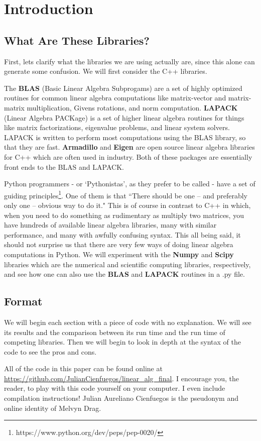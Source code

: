 \chapter{Introduction}
\section{What Are These Libraries?}
First, lets clarify what the libraries we are using actually are, since this alone can generate some confusion. We will first consider the C++ libraries.

The \textbf{BLAS} (Basic Linear Algebra Subprogams) are a set of highly optimized routines for common linear algebra computations like matrix-vector and matrix-matrix multiplication, Givens rotations, and norm computation. \textbf{LAPACK} (Linear Algebra PACKage) is a set of higher linear algebra routines for things like matrix factorizations, eigenvalue problems, and linear system solvers. LAPACK is written to perform most computations using the BLAS library, so that they are fast. \textbf{Armadillo} and \textbf{Eigen} are open source linear algebra libraries for C++ which are often used in industry. Both of these packages are essentially front ends to the BLAS and LAPACK.

Python programmers - or `Pythonistas', as they prefer to be called - have a set of guiding principles\footnote{https://www.python.org/dev/peps/pep-0020/}. One of them is that ``There should be one -- and preferably only one -- obvious way to do it." This is of course in contrast to C++ in which, when you need to do something as rudimentary as multiply two matrices, you have hundreds of available linear algebra libraries, many with similar performance, and many with awfully confusing syntax. This all being said, it should not surprise us that there are very few ways of doing linear algebra computations in Python. We will experiment with the \textbf{Numpy} and \textbf{Scipy} libraries which are the numerical and scientific computing libraries, respectively, and see how one can also use the \textbf{BLAS} and \textbf{LAPACK} routines in a .py file.

\section{Format}
We will begin each section with a piece of code with no explanation. We will see its results and the comparison between its run time and the run time of competing libraries. Then we will begin to look in depth at the syntax of the code to see  the pros and cons.

All of the code in this paper can be found online at \url{https://github.com/JulianCienfuegos/linear_alg_final}. I encourage you, the reader, to play with this code yourself on your computer. I even include compilation instructions! Julian Aureliano Cienfuegos is the pseudonym and online identity of Melvyn Drag.